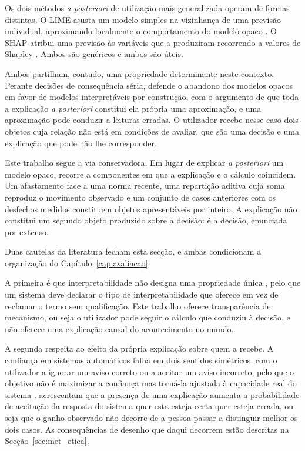 Os dois métodos \emph{a posteriori} de utilização mais generalizada operam de formas distintas. O
\gls{LIME} ajusta um modelo simples na vizinhança de uma previsão individual, aproximando
localmente o comportamento do modelo opaco \autocite{ribeiro2016lime}. O \gls{SHAP} atribui uma
previsão às variáveis que a produziram recorrendo a valores de Shapley \autocite{lundberg2017shap}.
Ambos são genéricos e ambos são úteis.

Ambos partilham, contudo, uma propriedade determinante neste contexto. Perante decisões de
consequência séria, \textcite{rudin2019stop} defende o abandono dos modelos opacos em favor de
modelos interpretáveis por construção, com o argumento de que toda a explicação \emph{a posteriori}
constitui ela própria uma aproximação, e uma aproximação pode conduzir a leituras erradas. O
utilizador recebe nesse caso dois objetos cuja relação não está em condições de avaliar, que são
uma decisão e uma explicação que pode não lhe corresponder.

Este trabalho segue a via conservadora. Em lugar de explicar \emph{a posteriori} um modelo opaco,
recorre a componentes em que a explicação e o cálculo coincidem. Um afastamento face a uma norma
recente, uma repartição aditiva cuja soma reproduz o movimento observado e um conjunto de casos
anteriores com os desfechos medidos constituem objetos apresentáveis por inteiro. A explicação
não constitui um segundo objeto produzido sobre a decisão: é a decisão, enunciada por extenso.

Duas cautelas da literatura fecham esta secção, e ambas condicionam a organização do
Capítulo~\ref{cap:avaliacao}.

A primeira é que interpretabilidade não designa uma propriedade única \autocite{lipton2018mythos},
pelo que um sistema deve declarar o tipo de interpretabilidade que oferece em vez de reclamar o
termo sem qualificação. Este trabalho oferece transparência de mecanismo, ou seja o utilizador pode
seguir o cálculo que conduziu à decisão, e não oferece uma explicação causal do acontecimento no
mundo.

A segunda respeita ao efeito da própria explicação sobre quem a recebe. A confiança em sistemas
automáticos falha em dois sentidos simétricos, com o utilizador a ignorar um aviso correto ou a
aceitar um aviso incorreto, pelo que o objetivo não é maximizar a confiança mas torná-la ajustada à
capacidade real do sistema \autocite{lee2004trust}. \textcite{bansal2021whole} acrescentam que a
presença de uma explicação aumenta a probabilidade de aceitação da resposta do sistema quer esta
esteja certa quer esteja errada, ou seja que o ganho observado não decorre de a pessoa passar a
distinguir melhor os dois casos. As consequências de desenho que daqui decorrem estão descritas na
Secção~\ref{sec:met_etica}.

